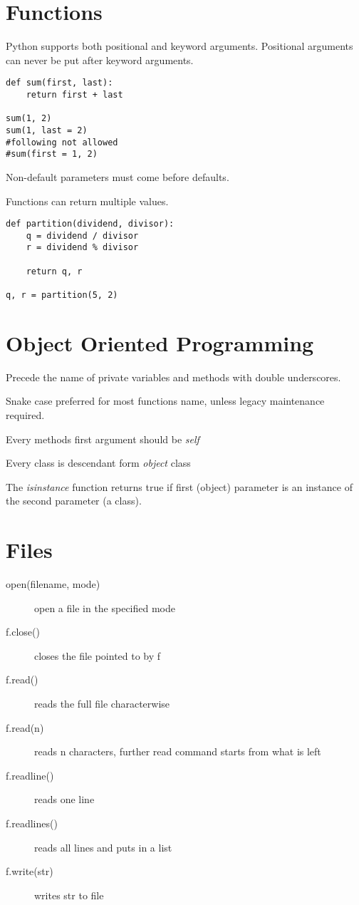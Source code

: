 \documentclass[a4paper, 12pt]{article}
\begin{document}
\section{Functions}
Python supports both positional and keyword arguments. Positional arguments can never be put after keyword arguments.
\begin{verbatim}
def sum(first, last):
    return first + last

sum(1, 2)
sum(1, last = 2)
#following not allowed
#sum(first = 1, 2)
\end{verbatim}

Non-default parameters must come before defaults.

Functions can return multiple values.
\begin{verbatim}
def partition(dividend, divisor):
    q = dividend / divisor
    r = dividend % divisor

    return q, r

q, r = partition(5, 2)
\end{verbatim}

\section{Object Oriented Programming}
Precede the name of private variables and methods with double underscores.

Snake case preferred for most functions name, unless legacy maintenance required.

Every methods first argument should be \emph{self}

Every class is descendant form \emph{object} class

The \emph{isinstance} function returns true if first (object) parameter is an instance of the second parameter (a class).

\section{Files}
\begin{description}
    \item[open(filename, mode)] open a file in the specified mode
    \item[f.close()] closes the file pointed to by f
    \item[f.read()] reads the full file characterwise
    \item[f.read(n)] reads n characters, further read command starts from what is left
    \item[f.readline()] reads one line
    \item[f.readlines()] reads all lines and puts in a list
    \item[f.write(str)] writes str to file
\end{description}
\end{document}
